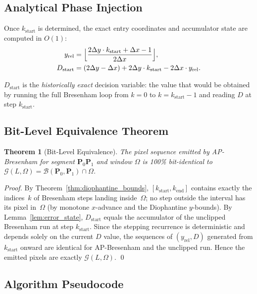 \documentclass[12pt,a4paper]{article}
\newtheorem{theorem}{Theorem}[section]
\theoremstyle{definition}
\newcommand{\Bresen}{\mathcal{B}}
\newcommand{\dx}{\Delta x}
\newcommand{\dy}{\Delta y}
\newcommand{\kst}{k_{\mathrm{start}}}
\newcommand{\ken}{k_{\mathrm{end}}}
\begin{document}
\subsection{Analytical Phase Injection}

Once $\kst$ is determined, the exact entry coordinates
and accumulator state are computed in $O(1)$:
\begin{align}
  y_{\mathrm{rel}} &= \Bigl\lfloor
    \frac{2\dy \cdot \kst + \dx - 1}{2\dx}
    \Bigr\rfloor,\label{eq:yrel}\\
  D_{\mathrm{start}} &= (2\dy - \dx) + 2\dy\cdot\kst
    - 2\dx\cdot y_{\mathrm{rel}}.\label{eq:Dstart}
\end{align}

$D_{\mathrm{start}}$ is the \emph{historically exact}
decision variable: the value that would be obtained by
running the full Bresenham loop from $k=0$ to
$k=\kst-1$ and reading $D$ at step $\kst$.

\subsection{Bit-Level Equivalence Theorem}

\begin{theorem}[Bit-Level Equivalence]
\label{thm:bit_identity}
The pixel sequence emitted by AP-Bresenham for segment
$\mathbf{P}_0\mathbf{P}_1$ and window $\Omega$ is
100\% bit-identical to
$\mathcal{G}(L,\Omega) = \Bresen(\mathbf{P}_0,
\mathbf{P}_1) \cap \Omega$.
\end{theorem}

\begin{proof}
By Theorem~\ref{thm:diophantine_bounds}, $[\kst, \ken]$
contains exactly the indices~$k$ of Bresenham steps
landing inside~$\Omega$; no step outside the interval has
its pixel in~$\Omega$ (by monotone $x$-advance and the
Diophantine $y$-bounds). By Lemma~\ref{lem:error_state},
$D_{\mathrm{start}}$ equals the accumulator of the
unclipped Bresenham run at step $\kst$. Since the stepping
recurrence is deterministic and depends solely on the
current $D$ value, the sequences of $(y_{\mathrm{rel}}, D)$
generated from $\kst$ onward are identical for AP-Bresenham
and the unclipped run. Hence the emitted pixels are exactly
$\mathcal{G}(L,\Omega)$. \qed
\end{proof}

\subsection{Algorithm Pseudocode}
\end{document}
